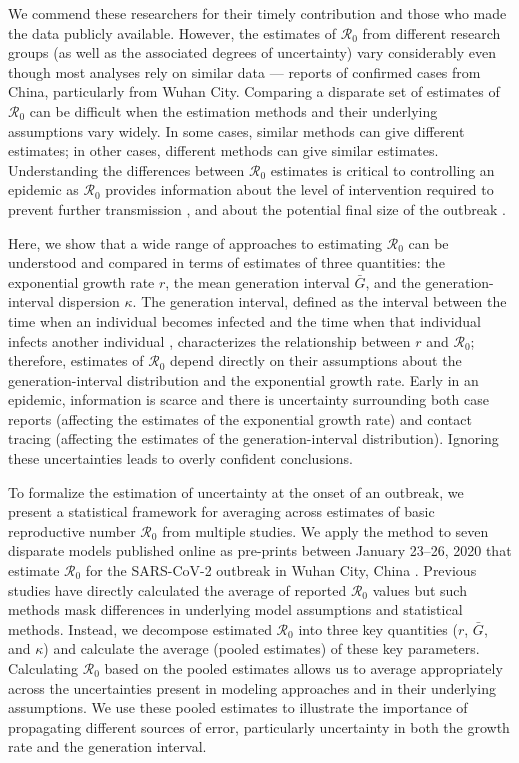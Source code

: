 \documentclass[12pt]{article}
\newcommand{\Ro}{\ensuremath{{\mathcal R}_{0}}\xspace}
\begin{document}
We commend these researchers for their timely contribution and those who made the data publicly available.
However, the estimates of \Ro from different research groups (as well as the associated degrees of uncertainty) vary considerably even though most analyses rely on similar data --- reports of confirmed cases from China, particularly from Wuhan City.
Comparing a disparate set of estimates of \Ro can be difficult when the estimation methods and their underlying assumptions vary widely.
In some cases, similar methods can give different estimates; in other cases, different methods can give similar estimates.
Understanding the differences between \Ro estimates is critical to controlling an epidemic as \Ro provides information about the level of intervention required to prevent further transmission \citep{anderson1991infectious}, and about the potential final size of the outbreak \citep{anderson1991infectious, ma2006generality}.

Here, we show that a wide range of approaches to estimating \Ro can be understood and compared in terms of estimates of three quantities: the exponential growth rate $r$, the mean generation interval $\bar G$, and the generation-interval dispersion $\kappa$.
The generation interval, defined as the interval between the time when an individual becomes infected and the time when that individual infects another individual \citep{svensson2007note}, characterizes the relationship between $r$ and \Ro \citep{wearing2005appropriate, roberts2007model, wallinga2007generation, park2019practical};
therefore, estimates of \Ro depend directly on their assumptions about the generation-interval distribution and the exponential growth rate.
Early in an epidemic, information is scarce and there is uncertainty surrounding both case reports (affecting the estimates of the exponential growth rate) and contact tracing (affecting the estimates of the generation-interval distribution).
Ignoring these uncertainties leads to overly confident conclusions.

To formalize the estimation of uncertainty at the onset of an outbreak, we present a statistical framework for averaging across estimates of basic reproductive number \Ro from multiple studies. 
We apply the method to seven disparate models published online as pre-prints between January 23--26, 2020 that estimate \Ro for the SARS-CoV-2 outbreak in Wuhan City, China \citep{bedfordncov, imaincov, liuncov, majumderncov, readncov, riouncov, zhaoncov}.
Previous studies have directly calculated the average of reported \Ro values \citep{majumder2020early, liu2020reproductive} but such methods mask differences in underlying model assumptions and statistical methods.
Instead, we decompose estimated \Ro into three key quantities ($r$, $\bar G$, and $\kappa$) and calculate the average (pooled estimates) of these key parameters.
Calculating \Ro based on the pooled estimates allows us to average appropriately across the uncertainties present in modeling approaches and in their underlying assumptions.
We use these pooled estimates to illustrate the importance of propagating different sources of error, particularly uncertainty in both the growth rate and the generation interval.
\end{document}
